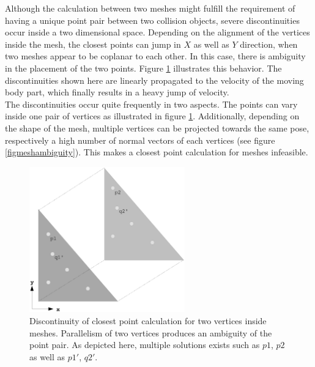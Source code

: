 Although the calculation between two meshes might fulfill the requirement of having a unique point pair between two collision objects, severe discontinuities occur inside a two dimensional space. Depending on the alignment of the vertices inside the mesh, the closest points can jump in $X$ as well as $Y$ direction, when two meshes appear to be coplanar to each other. In this case, there is ambiguity in the placement of the two points. Figure \ref{figclosestpointmesh} illustrates this behavior. The discontinuities shown here are linearly propagated to the velocity of the moving body part, which finally results in a heavy jump of velocity.\\
The discontinuities occur quite frequently in two aspects. The points can vary inside one pair of vertices as illustrated in figure \ref{figclosestpointmesh}. Additionally, depending on the shape of the mesh, multiple vertices can be projected towards the same pose, respectively a high number of normal vectors of each vertices (see figure \ref{figmeshambiguity}). This makes a closest point calculation for meshes infeasible.  

\begin{figure}[h!]
  \centering
    \includegraphics[width=0.6\textwidth]{../figures/closestpointmesh.eps}
    \caption{Discontinuity of closest point calculation for two vertices inside meshes. Parallelism of two vertices produces an ambiguity of the point pair. As depicted here, multiple solutions exists such as $p1$, $p2$ as well as $p1'$, $q2'$.}
    \label{figclosestpointmesh}
\end{figure}

